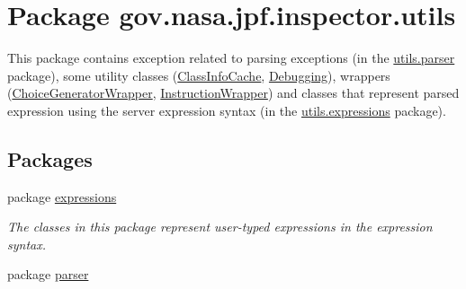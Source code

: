 \hypertarget{namespacegov_1_1nasa_1_1jpf_1_1inspector_1_1utils}{}\section{Package gov.\+nasa.\+jpf.\+inspector.\+utils}
\label{namespacegov_1_1nasa_1_1jpf_1_1inspector_1_1utils}


This package contains exception related to parsing exceptions (in the \hyperlink{namespacegov_1_1nasa_1_1jpf_1_1inspector_1_1utils_1_1parser}{utils.\+parser} package), some utility classes (\hyperlink{classgov_1_1nasa_1_1jpf_1_1inspector_1_1utils_1_1_class_info_cache}{Class\+Info\+Cache}, \hyperlink{classgov_1_1nasa_1_1jpf_1_1inspector_1_1utils_1_1_debugging}{Debugging}), wrappers (\hyperlink{classgov_1_1nasa_1_1jpf_1_1inspector_1_1utils_1_1_choice_generator_wrapper}{Choice\+Generator\+Wrapper}, \hyperlink{classgov_1_1nasa_1_1jpf_1_1inspector_1_1utils_1_1_instruction_wrapper}{Instruction\+Wrapper}) and classes that represent parsed expression using the server expression syntax (in the \hyperlink{namespacegov_1_1nasa_1_1jpf_1_1inspector_1_1utils_1_1expressions}{utils.\+expressions} package).  


\subsection*{Packages}
\begin{DoxyCompactItemize}
\item 
package \hyperlink{namespacegov_1_1nasa_1_1jpf_1_1inspector_1_1utils_1_1expressions}{expressions}
\begin{DoxyCompactList}\small\item\em The classes in this package represent user-\/typed expressions in the expression syntax. \end{DoxyCompactList}\item 
package \hyperlink{namespacegov_1_1nasa_1_1jpf_1_1inspector_1_1utils_1_1parser}{parser}
\end{DoxyCompactItemize}
